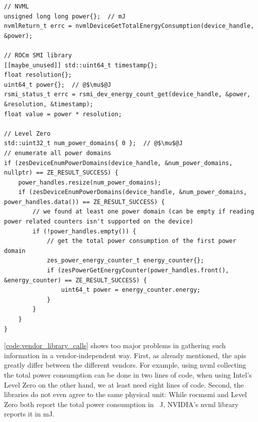 \begin{listing}
    \begin{verbatim}
// NVML
unsigned long long power{};  // mJ
nvmlReturn_t errc = nvmlDeviceGetTotalEnergyConsumption(device_handle, &power);

// ROCm SMI library
[[maybe_unused]] std::uint64_t timestamp{};
float resolution{};
uint64_t power{};  // @$\mu$@J
rsmi_status_t errc = rsmi_dev_energy_count_get(device_handle, &power, &resolution, &timestamp);
float value = power * resolution;

// Level Zero
std::uint32_t num_power_domains{ 0 };  // @$\mu$@J
// enumerate all power domains
if (zesDeviceEnumPowerDomains(device_handle, &num_power_domains, nullptr) == ZE_RESULT_SUCCESS) {
    power_handles.resize(num_power_domains);
    if (zesDeviceEnumPowerDomains(device_handle, &num_power_domains, power_handles.data()) == ZE_RESULT_SUCCESS) {
        // we found at least one power domain (can be empty if reading power related counters isn't supported on the device)
        if (!power_handles.empty()) {
            // get the total power consumption of the first power domain
            zes_power_energy_counter_t energy_counter{};
            if (zesPowerGetEnergyCounter(power_handles.front(), &energy_counter) == ZE_RESULT_SUCCESS) {
                uint64_t power = energy_counter.energy;
            }
        }
    }
}
    \end{verbatim}
    \caption{
    Example library function calls to gather the total power consumption since the last driver reload from an NVIDIA \gls{gpu} using \gls{nvml}, an AMD \gls{gpu} using \gls{rocmsmi}, and Intel \gls{gpu} using Level Zero.
    Note that the respective environments must be initialized beforehand and that the  points to a supported and available device.}
    \label{code:vendor_library_calls}
\end{listing}

\autoref{code:vendor_library_calls} shows too major problems in gathering such information in a vendor-independent way. 
First, as already mentioned, the \glspl{api} greatly differ between the different vendors. 
For example, using \gls{nvml} collecting the total power consumption can be done in two lines of code, when using Intel's Level Zero on the other hand, we at least need eight lines of code. 
Second, the libraries do not even agree to the same physical unit: While \gls{rocmsmi} and Level Zero both report the total power consumption in \si{\mu\joule}, NVIDIA's \gls{nvml} library reports it in \si{\milli\joule}.

